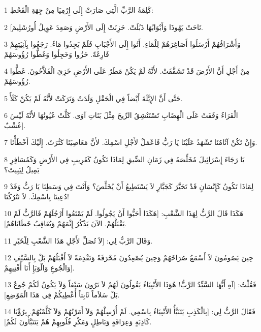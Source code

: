 \par 1 كَلِمَةُ الرَّبِّ الَّتِي صَارَتْ إِلَى إِرْمِيَا مِنْ جِهَةِ الْقَحْطِ:
\par 2 [نَاحَتْ يَهُوذَا وَأَبْوَابُهَا ذَبُلَتْ. حَزِنَتْ إِلَى الأَرْضِ وَصَعِدَ عَوِيلُ أُورُشَلِيمَ.
\par 3 وَأَشْرَافُهُمْ أَرْسَلُوا أَصَاغِرَهُمْ لِلْمَاءِ. أَتُوا إِلَى الأَجْبَابِ فَلَمْ يَجِدُوا مَاءً. رَجَعُوا بِآنِيَتِهِمْ فَارِغَةً. خَزُوا وَخَجِلُوا وَغَطُّوا رُؤُوسَهُمْ
\par 4 مِنْ أَجْلِ أَنَّ الأَرْضَ قَدْ تَشَقَّقَتْ. لأَنَّهُ لَمْ يَكُنْ مَطَرٌ عَلَى الأَرْضِ خَزِيَ الْفَلاَّحُونَ. غَطُّوا رُؤُوسَهُمْ.
\par 5 حَتَّى أَنَّ الإِيَّلَةَ أَيْضاً فِي الْحَقْلِ وَلَدَتْ وَتَرَكَتْ لأَنَّهُ لَمْ يَكُنْ كَلَأٌ.
\par 6 الْفَرَاءُ وَقَفَتْ عَلَى الْهِضَابِ تَسْتَنْشِقُ الرِّيحَ مِثْلَ بَنَاتِ آوَى. كَلَّتْ عُيُونُهَا لأَنَّهُ لَيْسَ عُشْبٌ].
\par 7 وَإِنْ تَكُنْ آثَامُنَا تَشْهَدُ عَلَيْنَا يَا رَبُّ فَاعْمَلْ لأَجْلِ اسْمِكَ. لأَنَّ مَعَاصِيَنَا كَثُرَتْ. إِلَيْكَ أَخْطَأْنَا.
\par 8 يَا رَجَاءَ إِسْرَائِيلَ مُخَلِّصَهُ فِي زَمَانِ الضِّيقِ لِمَاذَا تَكُونُ كَغَرِيبٍ فِي الأَرْضِ وَكَمُسَافِرٍ يَمِيلُ لِيَبِيتَ؟
\par 9 لِمَاذَا تَكُونُ كَإِنْسَانٍ قَدْ تَحَيَّرَ كَجَبَّارٍ لاَ يَسْتَطِيعُ أَنْ يُخَلِّصَ؟ وَأَنْتَ فِي وَسَطِنَا يَا رَبُّ وَقَدْ دُعِينَا بِاسْمِكَ. لاَ تَتْرُكْنَا!
\par 10 هَكَذَا قَالَ الرَّبُّ لِهَذَا الشَّعْبِ: [هَكَذَا أَحَبُّوا أَنْ يَجُولُوا. لَمْ يَمْنَعُوا أَرْجُلَهُمْ فَالرَّبُّ لَمْ يَقْبَلْهُمْ. الآنَ يَذْكُرُ إِثْمَهُمْ وَيُعَاقِبُ خَطَايَاهُمْ].
\par 11 وَقَالَ الرَّبُّ لِي: [لاَ تُصَلِّ لأَجْلِ هَذَا الشَّعْبِ لِلْخَيْرِ.
\par 12 حِينَ يَصُومُونَ لاَ أَسْمَعُ صُرَاخَهُمْ وَحِينَ يُصْعِدُونَ مُحْرَقَةً وَتَقْدِمَةً لاَ أَقْبَلُهُمْ بَلْ بِالسَّيْفِ وَالْجُوعِ وَالْوَبَإِ أَنَا أُفْنِيهِمْ].
\par 13 فَقُلْتُ: [آهِ أَيُّهَا السَّيِّدُ الرَّبُّ! هُوَذَا الأَنْبِيَاءُ يَقُولُونَ لَهُمْ لاَ تَرُونَ سَيْفاً وَلاَ يَكُونُ لَكُمْ جُوعٌ بَلْ سَلاَماً ثَابِتاً أُعْطِيكُمْ فِي هَذَا الْمَوْضِعِ].
\par 14 فَقَالَ الرَّبُّ لِي: [بِالْكَذِبِ يَتَنَبَّأُ الأَنْبِيَاءُ بِاسْمِي. لَمْ أُرْسِلْهُمْ وَلاَ أَمَرْتُهُمْ وَلاَ كَلَّمْتُهُمْ. بِرُؤْيَا كَاذِبَةٍ وَعِرَافَةٍ وَبَاطِلٍ وَمَكْرِ قُلُوبِهِمْ هُمْ يَتَنَبَّأُونَ لَكُمْ].
